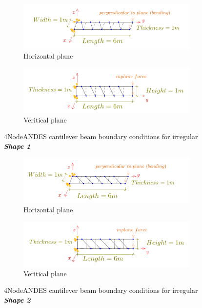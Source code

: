 \documentclass[fleqn,11pt,letter]{article}
\begin{document}
\begin{figure}[H]
  \centering
    \begin{subfigure}{0.5\textwidth}
      \centering
      \includegraphics[width=9cm]{../Figure_files/4NodeANDES/beam_ANDES_xy_bending_shape1.pdf}
      \caption{Horizontal plane}
    \end{subfigure}
    \begin{subfigure}{0.5\textwidth}
      \centering
      \includegraphics[width=9cm]{../Figure_files/4NodeANDES/beam_ANDES_yz_inPlane_shape1.pdf}
      \caption{Veritical  plane}
    \end{subfigure}
      \captionsetup{justification=centering,margin=3cm}
  \caption{4NodeANDES cantilever beam boundary conditions for irregular \textbf{\emph{Shape 1}} }
  \label{fig irregular shape 1 4NodeANDES cantilever beams bc}
\end{figure}



\begin{figure}[H]
  \centering
    \begin{subfigure}{0.5\textwidth}
      \centering
      \includegraphics[width=9cm]{../Figure_files/4NodeANDES/beam_ANDES_xy_bending_shape2.pdf}
      \caption{Horizontal plane}
    \end{subfigure}
    \begin{subfigure}{0.5\textwidth}
      \centering
      \includegraphics[width=9cm]{../Figure_files/4NodeANDES/beam_ANDES_yz_inPlane_shape2.pdf}
      \caption{Veritical  plane}
    \end{subfigure}
      \captionsetup{justification=centering,margin=3cm}
  \caption{4NodeANDES cantilever beam boundary conditions for irregular \textbf{\emph{Shape 2}} }
  \label{fig irregular shape 2 4NodeANDES cantilever beams bc}
\end{figure}
\end{document}
